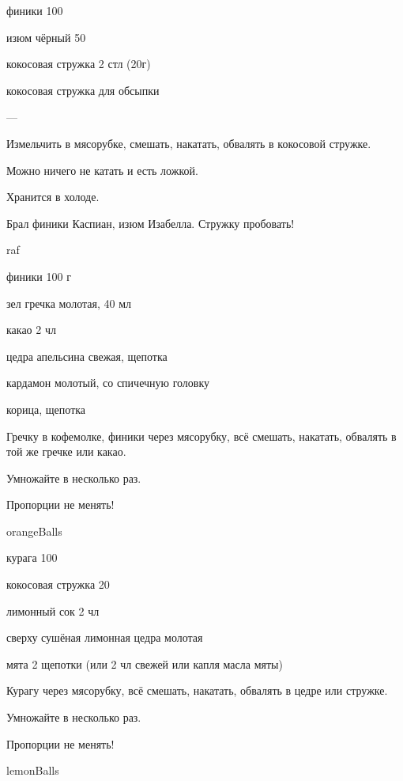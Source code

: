 {
\item финики 100
\item изюм чёрный 50
\item кокосовая стружка 2 стл (20г)
\item кокосовая стружка для обсыпки
}{
\item ---
}{
Измельчить в мясорубке, смешать, накатать, обвалять в кокосовой стружке.  
}{
\begin{advice}
\item Можно ничего не катать и есть ложкой.
    \item Хранится в холоде.
        \item Брал финики Каспиан, изюм Изабелла. Стружку пробовать!

\end{advice}
}{raf}





{
\item финики 100 г
\item зел гречка молотая, 40 мл
\item какао 2 чл
}{
\item цедра апельсина свежая, щепотка
\item кардамон молотый, со спичечную головку
\item корица, щепотка
}{
Гречку в кофемолке, финики через мясорубку, всё смешать, накатать, обвалять в той же гречке или какао.
 
}{
\begin{advice}
\item Умножайте в несколько раз.
\item Пропорции не менять!
\end{advice}}{orangeBalls}







{
\item курага 100
\item кокосовая стружка 20
\item лимонный сок 2 чл
\item сверху сушёная лимонная цедра молотая
}{
\item мята 2 щепотки (или 2 чл свежей или капля масла мяты)
}{
Курагу через мясорубку, всё смешать, накатать, обвалять в цедре или стружке. 
}{
\begin{advice}
\item Умножайте в несколько раз.
\item Пропорции не менять!
\end{advice}}{lemonBalls}







